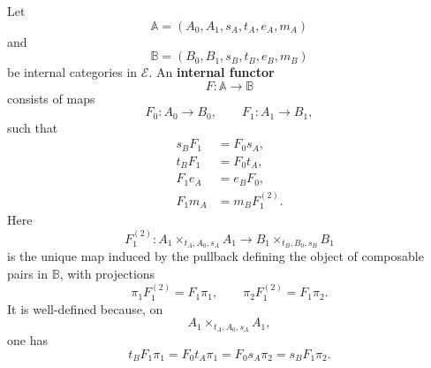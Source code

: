 \begin{definition}
\label{def:internal-functor}
    Let
    \[
        \mathbb A=(A_0,A_1,s_A,t_A,e_A,m_A)
    \]
    and
    \[
        \mathbb B=(B_0,B_1,s_B,t_B,e_B,m_B)
    \]
    be internal categories in \(\mathcal E\). An \textbf{internal functor}
    \[
        F:\mathbb A\to\mathbb B
    \]
    consists of maps
    \[
        F_0:A_0\to B_0,
        \qquad
        F_1:A_1\to B_1,
    \]
    such that
    \begin{align}
        s_BF_1&=F_0s_A,
        \label{eq:internal-functor-source}
        \\
        t_BF_1&=F_0t_A,
        \label{eq:internal-functor-target}
        \\
        F_1e_A&=e_BF_0,
        \label{eq:internal-functor-identity}
        \\
        F_1m_A&=m_BF_1^{(2)}.
        \label{eq:internal-functor-composition}
    \end{align}
    Here
    \[
        F_1^{(2)}:
        A_1\times_{t_A,A_0,s_A}A_1
        \longrightarrow
        B_1\times_{t_B,B_0,s_B}B_1
    \]
    is the unique map induced by the pullback defining the object of composable pairs in \(\mathbb B\), with projections
    \[
        \pi_1F_1^{(2)}=F_1\pi_1,
        \qquad
        \pi_2F_1^{(2)}=F_1\pi_2.
    \]
    It is well-defined because, on
    \[
        A_1\times_{t_A,A_0,s_A}A_1,
    \]
    one has
    \[
        t_BF_1\pi_1
        =
        F_0t_A\pi_1
        =
        F_0s_A\pi_2
        =
        s_BF_1\pi_2.
    \]


\end{definition}
